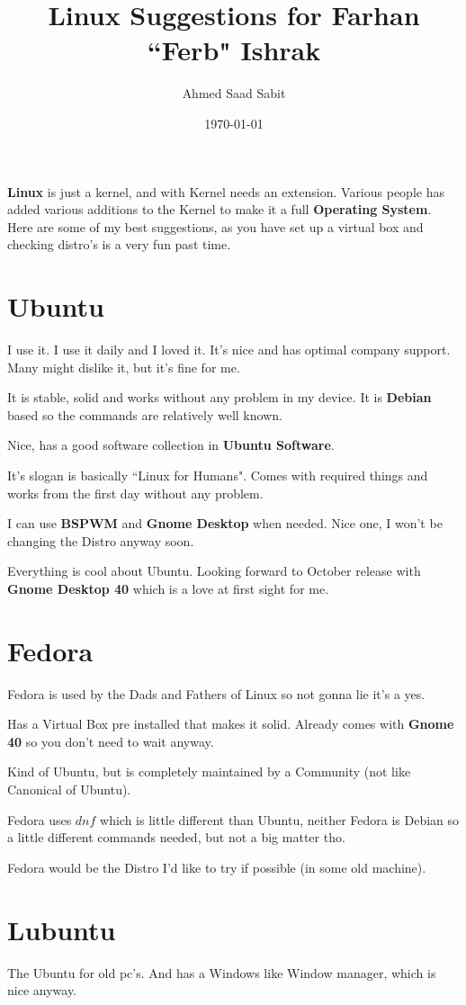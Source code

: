 \documentclass[10pt, a4paper]{memoir}
\title{Linux Suggestions for Farhan ``Ferb" Ishrak}
\author{Ahmed Saad Sabit}
\date{\today}
\begin{document}
\maketitle


\textbf{Linux} is just a kernel, and with Kernel needs an extension. Various people has added various additions to the Kernel to make it a full \textbf{Operating System}. Here are some of my best suggestions, as you have set up a virtual box and checking distro's is a very fun past time. 

\section{Ubuntu}
I use it. I use it daily and I loved it. It's nice and has optimal company support. Many might dislike it, but it's fine for me. 

It is stable, solid and works without any problem in my device. It is \textbf{Debian} based so the commands are relatively well known. 

Nice, has a good software collection in \textbf{Ubuntu Software}. 

It's slogan is basically ``Linux for Humans". Comes with required things and works from the first day without any problem. 

I can use \textbf{BSPWM} and \textbf{Gnome Desktop} when needed. Nice one, I won't be changing the Distro anyway soon. 

Everything is cool about Ubuntu. Looking forward to October release with  \textbf{Gnome Desktop 40} which is a love at first sight for me.


\section{ Fedora}   
Fedora is used by the Dads and Fathers of Linux so not gonna lie it's a yes. 

Has a Virtual Box pre installed that makes it solid. Already comes with  \textbf{Gnome 40} so you don't need to wait anyway. 

Kind of Ubuntu, but is completely maintained by a Community (not like Canonical of Ubuntu). 

Fedora uses $dnf$ which is little different than Ubuntu, neither Fedora is Debian so a little different commands needed, but not a big matter tho. 

Fedora would be the Distro I'd like to try if possible (in some old machine).

\section{ Lubuntu}
The Ubuntu for old pc's. And has a Windows like Window manager, which is nice anyway. 
\end{document}
